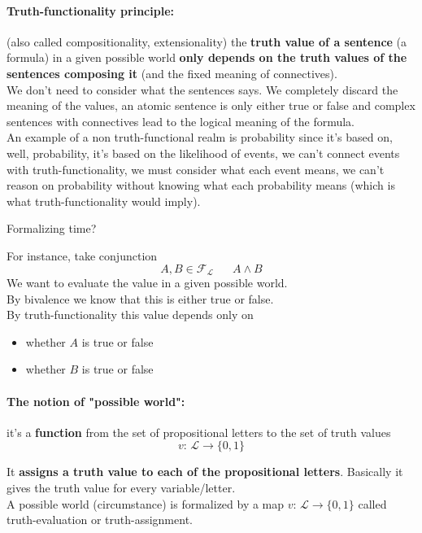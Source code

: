 \documentclass[11pt]{article}
\begin{document}
	\paragraph{Truth-functionality principle:} (also called compositionality, extensionality) the \textbf{truth value of a sentence} (a formula) in a given possible world \textbf{only depends on the truth values of the sentences composing it} (and the fixed meaning of connectives). \\
	We don't need to consider what the sentences says. We completely discard the meaning of the values, an atomic sentence is only either true or false and complex sentences with connectives lead to the logical meaning of the formula.\\
	
	An example of a non truth-functional realm is probability since it's based on, well, probability, it's based on the likelihood of events, we can't connect events with truth-functionality, we must consider what each event means, we can't reason on probability without knowing what each probability means (which is what truth-functionality would imply).\\
	
	\newpage
	
	Formalizing time?
	
	For instance, take conjunction
	$$ A, B \in \mathcal{F}_{\mathcal{L}} \;\;\;\;\;\; A \wedge B$$
	We want to evaluate the value in a given possible world.\\
	
	By bivalence we know that this is either true or false.\\
	By truth-functionality this value depends only on
	\begin{itemize}
		\item whether $A$ is true or false 
		\item whether $B$ is true or false
	\end{itemize} 
	
	\paragraph{The notion of "possible world":} it's a \textbf{function} from the set of propositional letters to the set of truth values 
	$$ v: \, \mathcal{L} \rightarrow \{0,1\} $$
	
	It \textbf{assigns a truth value to each of the propositional letters}. Basically it gives the truth value for every variable/letter.\\
	A possible world (circumstance) is formalized by a map $ v: \, \mathcal{L} \rightarrow \{0,1\} $ called truth-evaluation or truth-assignment.\\
	
\end{document}
